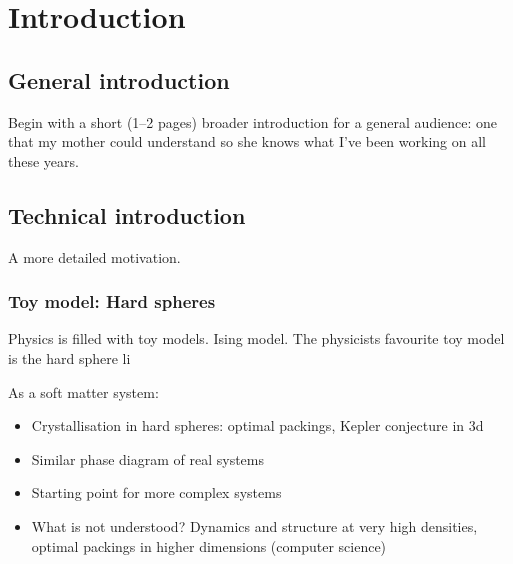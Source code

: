 \documentclass[12pt]{report}
\begin{document}
\chapter{Introduction}

\section{General introduction}
Begin with a short (1–2 pages) broader introduction for a general audience: one that my mother could understand so she knows what I’ve been working on all these years.

\section{Technical introduction}
A more detailed motivation.

\subsection{Toy model: Hard spheres}

Physics is filled with toy models.
Ising model.
The physicists favourite toy model is the hard sphere li

As a soft matter system:
\begin{itemize}
\item Crystallisation in hard spheres: optimal packings, Kepler conjecture in 3d
\item Similar phase diagram of real systems
\item Starting point for more complex systems
\item What is not understood? Dynamics and structure at very high densities, optimal packings in higher dimensions (computer science)
\end{itemize}
\end{document}
